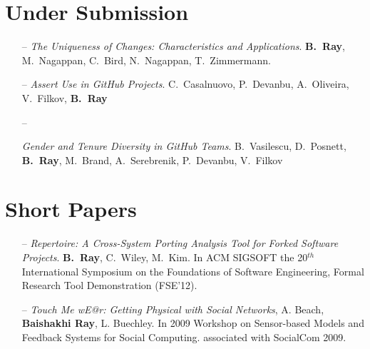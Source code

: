 \documentclass[overlapped,line,letterpaper, 12pt]{res}
\begin{document}
\begin{resume}
\section{\small Under Submission}

\begin{itemize}



\item[--]
{\em The Uniqueness of Changes: Characteristics and Applications}. 
{\bf B.~Ray}, M.~Nagappan, C.~Bird, N.~Nagappan, T.~Zimmermann.

\item[--]
{\em Assert Use in GitHub Projects}.
C.~Casalnuovo, P.~Devanbu, A.~Oliveira, V.~Filkov, {\bf B.~Ray}

\item[--]

{\em Gender and Tenure Diversity in GitHub Teams}.
B.~Vasilescu, D.~Posnett, {\bf B.~Ray},  M.~Brand, A.~Serebrenik, P.~Devanbu, V.~Filkov



\end{itemize}

\section{\small Short Papers}

\begin{itemize}
\item[--]
{\em Repertoire: A Cross-System Porting Analysis Tool for Forked Software Projects}. 
{\bf B.~Ray}, C.~Wiley, M.~Kim.
{\small In ACM SIGSOFT the 20$^{th}$ International Symposium on the Foundations of Software Engineering, Formal Research Tool Demonstration (FSE'12).}

\item[--]
{\em Touch Me wE@r: Getting Physical with Social Networks},
A. Beach, {\bf Baishakhi Ray}, L. Buechley. 
{\small In 2009 Workshop on Sensor-based Models and Feedback Systems for Social Computing. associated with SocialCom 2009.}
\end{itemize}



\end{resume}
\end{document}
